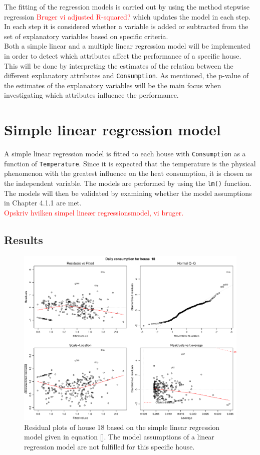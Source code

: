 \noindent The fitting of the regression models is carried out by using the method stepwise regression \textcolor{red}{Bruger vi adjusted R-squared?} which updates the model in each step. In each step it is considered whether a variable is added or subtracted from the set of explanatory variables based on specific criteria. \\

\noindent Both a simple linear and a multiple linear regression model will be implemented in order to detect which attributes affect the performance of a specific house. This will be done by interpreting the estimates of the relation between the different explanatory attributes and \texttt{Consumption}. As mentioned, the p-value of the estimates of the explanatory variables will be the main focus when investigating which attributes influence the performance. 

\section{Simple linear regression model}
A simple linear regression model is fitted to each house with \texttt{Consumption} as a function of \texttt{Temperature}. Since it is expected that the temperature is the physical phenomenon with the greatest influence on the heat consumption, it is chosen as the independent variable. The models are performed by using the \texttt{lm()} function. The models will then be validated by examining whether the model assumptions in Chapter 4.1.1 are met. \\

\noindent \textcolor{red}{Opskriv hvilken simpel lineær regressionsmodel, vi bruger.}

\subsection{Results}
\begin{figure}
    \centering
    \includegraphics[width=1.\textwidth]{../../../figures/simple_lm18.pdf}
    \caption{Residual plots of house 18 based on the simple linear regression model given in equation \eqref{}. The model assumptions of a linear regression model are not fulfilled for this specific house.}
    \label{fig: simple_lm_18}
\end{figure}

